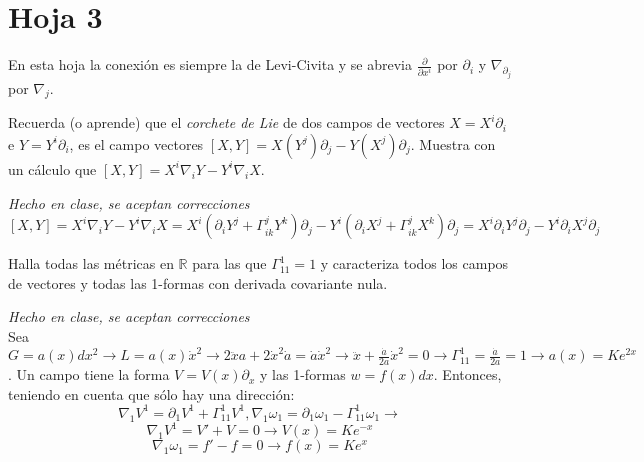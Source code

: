 \section{Hoja 3}
{\footnotesize En esta hoja la conexión es siempre la de Levi-Civita y se abrevia $\frac{\partial}{\partial x^i}$ por $\partial_i$ y  $\nabla_{\partial_j}$ por $\nabla_{j}$.}
\begin{problem}[1] Recuerda (o aprende) que el \emph{corchete de Lie}
	de dos campos de vectores $X=X^i\partial_i$ e $Y=Y^i\partial_i$, es el campo vectores
	$
	[X,Y]= 
	X(Y^j)\partial_j-Y(X^j)\partial_j$.
	Muestra con un cálculo que $[X,Y]= X^i\nabla_iY-Y^i\nabla_iX$.
	
	\solution\textit{Hecho en clase, se aceptan correcciones}\\ $$[X,Y]=X^i\nabla_iY-Y^i\nabla_iX=X^i(\partial_iY^j+\Gamma^j_{ik}Y^k)\partial_j-Y^i(\partial_iX^j+\Gamma^j_{ik}X^k)\partial_j=X^i\partial_iY^j\partial_j-Y^i\partial_iX^j\partial_j$$
	
\end{problem}
\begin{problem}[3] Halla todas las métricas en  $ℝ$ para las que $\Gamma_{11}^1=1$ y caracteriza todos los campos de vectores y todas las 1-formas con derivada covariante nula. 
	
	\solution\textit{Hecho en clase, se aceptan correcciones}\\ Sea $G=a(x)dx^2\longrightarrow L=a(x)\dot{x}^2\longrightarrow2\ddot{x}a+2\dot{x}^2\dot{a}=\dot{a}\dot{x}^2\longrightarrow\ddot{x}+\frac{\dot{a}}{2a}\dot{x}^2=0\longrightarrow\Gamma^1_{11}=\frac{\dot{a}}{2a}=1\longrightarrow a(x)=Ke^{2x}$. Un campo tiene la forma $V =V(x)\partial_x$ y las 1-formas $w = f (x)dx$. Entonces, teniendo en cuenta que sólo hay una dirección: $$\nabla_1V^1=\partial_1V^1+\Gamma^1_11V^1,\nabla_1\omega_1=\partial_1\omega_1-\Gamma^1_{11}\omega_1\longrightarrow$$ $$\nabla_1V^1=V'+V=0\longrightarrow V(x)=Ke^{-x}$$ $$\nabla_1\omega_1=f'-f=0\longrightarrow f(x)=Ke^{x}$$
	
\end{problem}
